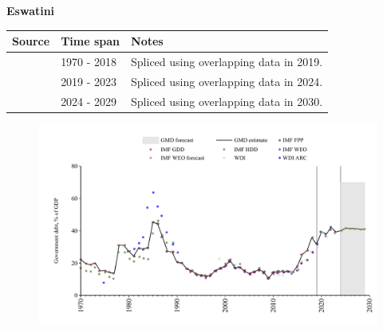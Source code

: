 \documentclass[12pt,a4paper,landscape]{article}
\begin{document}
\begin{adjustbox}{max totalsize={\paperwidth}{\paperheight},center}
\begin{minipage}[t][\textheight][t]{\textwidth}
\vspace*{0.5cm}
{}
\begin{center}
{\Large\bfseries Eswatini}
\end{center}
\vspace{0.5cm}
\begin{table}[H]
\centering
\small
\begin{tabular}{|l|l|l|}
\hline
\textbf{Source} & \textbf{Time span} & \textbf{Notes} \\
\hline
\rowcolor{white}\cite{IMF_GDD}& 1970 - 2018 &Spliced using overlapping data in 2019.\\
\rowcolor{lightgray}\cite{IMF_FPP}& 2019 - 2023 &Spliced using overlapping data in 2024.\\
\rowcolor{white}\cite{IMF_WEO_forecast}& 2024 - 2029 &Spliced using overlapping data in 2030.\\
\hline
\end{tabular}
\end{table}
\begin{figure}[H]
\centering
\includegraphics[width=\textwidth,height=0.6\textheight,keepaspectratio]{graphs/SWZ_govdebt_GDP.pdf}
\end{figure}
\end{minipage}
\end{adjustbox}
\end{document}
